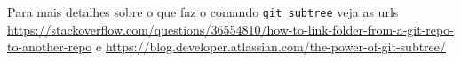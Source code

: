 Para mais detalhes sobre o que faz o comando \verb|git subtree| veja as urls \url{https://stackoverflow.com/questions/36554810/how-to-link-folder-from-a-git-repo-to-another-repo} e \url{https://blog.developer.atlassian.com/the-power-of-git-subtree/}





    

